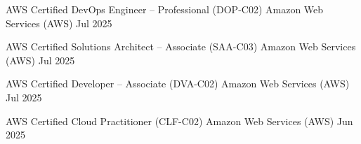 

\begin{cvhonors}

  \cvhonor
    {AWS Certified DevOps Engineer -- Professional (DOP-C02)} %
    {Amazon Web Services (AWS)} %
    {} %
    {Jul 2025} %

  \cvhonor
    {AWS Certified Solutions Architect -- Associate (SAA-C03)} %
    {Amazon Web Services (AWS)} %
    {} %
    {Jul 2025} %

  \cvhonor
    {AWS Certified Developer -- Associate (DVA-C02)} %
    {Amazon Web Services (AWS)} %
    {} %
    {Jul 2025} %

  \cvhonor
    {AWS Certified Cloud Practitioner (CLF-C02)} %
    {Amazon Web Services (AWS)} %
    {} %
    {Jun 2025} %

\end{cvhonors}
